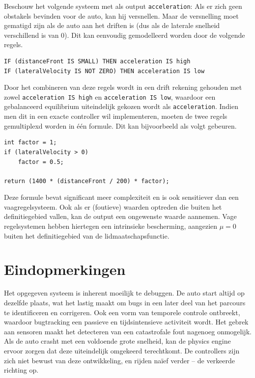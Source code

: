 \documentclass[10pt,a4paper]{article}
\begin{document}
			Beschouw het volgende systeem met als output \texttt{acceleration}: Als er zich geen obstakels bevinden voor de auto, kan hij versnellen. Maar de versnelling moet gematigd zijn als de auto aan het driften is (dus als de laterale snelheid verschillend is van 0).
			Dit kan eenvoudig gemodelleerd worden door de volgende regels.

			\begin{lstlisting}
IF (distanceFront IS SMALL) THEN acceleration IS high
IF (lateralVelocity IS NOT ZERO) THEN acceleration IS low
			\end{lstlisting}

			Door het combineren van deze regels wordt in een drift rekening gehouden met zowel \texttt{acceleration IS high} en \texttt{acceleration IS low}, waardoor een gebalanceerd equilibrium uiteindelijk gekozen wordt als \texttt{acceleration}.
			Indien men dit in een exacte controller wil implementeren, moeten de twee regels gemultiplexd worden in \'e\'en formule. Dit kan bijvoorbeeld als volgt gebeuren.

			\begin{lstlisting}
int factor = 1;
if (lateralVelocity > 0)
	factor = 0.5;

return (1400 * (distanceFront / 200) * factor);
			\end{lstlisting}

			Deze formule bevat significant meer complexiteit en is ook sensitiever dan een vaagregelsysteem. Ook als er (foutieve) waarden optreden die buiten het definitiegebied vallen, kan de output een ongewenste waarde aannemen. Vage regelsystemen hebben hiertegen een intrinsieke bescherming, aangezien $\mu = 0$ buiten het definitiegebied van de lidmaatschapsfunctie.

		\section*{Eindopmerkingen}
			Het opgegeven systeem is inherent moeilijk te debuggen. De auto start altijd op dezelfde plaats, wat het lastig maakt om bugs in een later deel van het parcours te identificeren en corrigeren. Ook een vorm van temporele controle ontbreekt, waardoor bugtracking een passieve en tijdsintensieve activiteit wordt. Het gebrek aan sensoren maakt het detecteren van een catastrofale fout nagenoeg onmogelijk. Als de auto crasht met een voldoende grote snelheid, kan de physics engine ervoor zorgen dat deze uiteindelijk omgekeerd terechtkomt. De controllers zijn zich niet bewust van deze ontwikkeling, en rijden na\"ief verder -- de verkeerde richting op.\\
\end{document}
